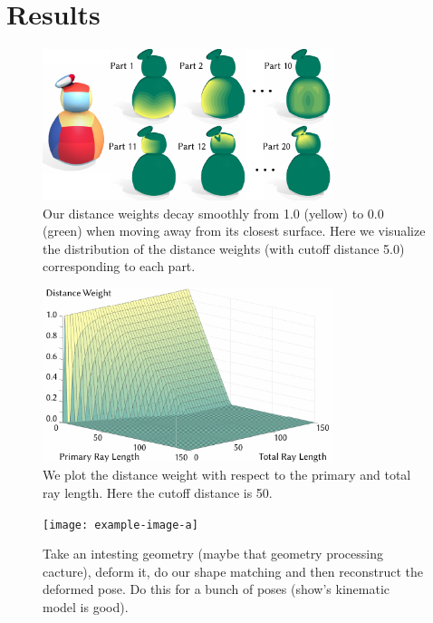 %
\section{Results}


\begin{figure}
  \centering
  \includegraphics[width=3.33in]{figures/distance_weight_puft.pdf}
  \caption{Our distance weights decay smoothly from 1.0 (yellow) to 0.0 (green) when moving away from its closest surface. Here we visualize the distribution of the distance weights (with cutoff distance 5.0) corresponding to each part.   
  }
  \label{fig:distance_weight_puft}
  \vspace{-5pt}
\end{figure} 
%
%
\begin{figure}
  \centering
  \includegraphics[width=3.33in]{figures/plot_distance_weight.pdf}
  \caption{We plot the distance weight with respect to the primary and total ray length. Here the cutoff distance is 50.
  }
  \label{fig:plot_distance_weight}
  \vspace{-5pt}
\end{figure} 

\begin{figure}
  \texttt{[image: example-image-a]}
  \caption{Take an intesting geometry (maybe that geometry processing cacture), deform it, do our shape matching and then reconstruct the deformed pose. Do this for a bunch of poses (show's kinematic model is good).}
  \label{fig:deform}
\end{figure}


